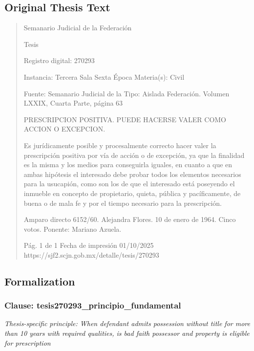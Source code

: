 \documentclass[11pt,a4paper]{article}
\begin{document}
\subsection{Original Thesis Text}

\begin{quote}
                                                   Semanario Judicial de la Federación

                                                  Tesis

 Registro digital: 270293

 Instancia: Tercera Sala          Sexta Época                           Materia(s): Civil

                                  Fuente: Semanario Judicial de la      Tipo: Aislada
                                  Federación.
                                  Volumen LXXIX, Cuarta Parte,
                                  página 63


PRESCRIPCION POSITIVA. PUEDE HACERSE VALER COMO ACCION O EXCEPCION.


Es jurídicamente posible y procesalmente correcto hacer valer la prescripción positiva por vía de
acción o de excepción, ya que la finalidad es la misma y los medios para conseguirla iguales, en
cuanto a que en ambas hipótesis el interesado debe probar todos los elementos necesarios para la
usucapión, como son los de que el interesado está poseyendo el inmueble en concepto de
propietario, quieta, pública y pacíficamente, de buena o de mala fe y por el tiempo necesario para la
prescripción.


Amparo directo 6152/60. Alejandra Flores. 10 de enero de 1964. Cinco votos. Ponente: Mariano
Azuela.




                                             Pág. 1 de 1             Fecha de impresión 01/10/2025
  https://sjf2.scjn.gob.mx/detalle/tesis/270293

\end{quote}

\subsection{Formalization}

\subsubsection{Clause: tesis270293\_principio\_fundamental}

\textit{Thesis-specific principle: When defendant admits possession without title for more than 10 years with required qualities, is bad faith possessor and property is eligible for prescription}
\end{document}
